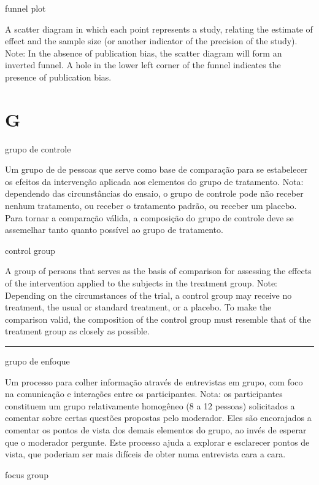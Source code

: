 \documentclass[
  openany]{book}
\begin{document}
funnel plot

A scatter diagram in which each point represents a study, relating the estimate of effect and the sample size (or another indicator of the precision of the study). Note: In the absence of publication bias, the scatter diagram will form an inverted funnel. A hole in the lower left corner of the funnel indicates the presence of publication bias.

\hypertarget{g}{%
\chapter*{G}\label{g}}

grupo de controle

Um grupo de de pessoas que serve como base de comparação para se estabelecer os efeitos da intervenção aplicada aos elementos do grupo de tratamento. Nota: dependendo das circunstâncias do ensaio, o grupo de controle pode não receber nenhum tratamento, ou receber o tratamento padrão, ou receber um placebo. Para tornar a comparação válida, a composição do grupo de controle deve se assemelhar tanto quanto possível ao grupo de tratamento.

control group

A group of persons that serves as the basis of comparison for assessing the effects of the intervention applied to the subjects in the treatment group. Note: Depending on the circumstances of the trial, a control group may receive no treatment, the usual or standard treatment, or a placebo. To make the comparison valid, the composition of the control group must resemble that of the treatment group as closely as possible.

\begin{center}\rule{0.5\linewidth}{0.5pt}\end{center}

grupo de enfoque

Um processo para colher informação através de entrevistas em grupo, com foco na comunicação e interações entre os participantes. Nota: os participantes constituem um grupo relativamente homogêneo (8 a 12 pessoas) solicitados a comentar sobre certas questões propostas pelo moderador. Eles são encorajados a comentar os pontos de vista dos demais elementos do grupo, ao invés de esperar que o moderador pergunte. Este processo ajuda a explorar e esclarecer pontos de vista, que poderiam ser mais difíceis de obter numa entrevista cara a cara.

focus group
\end{document}
